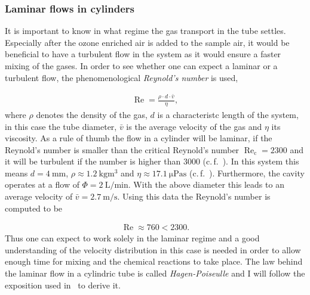 \subsubsection{Laminar flows in cylinders}
\label{sec:cylinder}

It is important to know in what regime the gas transport in the tube
settles. Especially after the ozone enriched air is added to the
sample air, it would be beneficial to have a turbulent flow in the
system as it would ensure a faster mixing of the gases. In order to see whether
one can expect a laminar or a turbulent flow, the phenomenological
\emph{Reynold's number} is used,

\begin{align*}
  \operatorname{Re} = \frac{\rho \cdot d \cdot \bar v}{\eta},
\end{align*}
where $\rho$ denotes the density of the gas, $d$ is a characteristc
length of the system, in this case the tube diameter, $\bar v$ is the
average velocity of the gas and $\eta$ its viscosity. As a rule of
thumb the flow in a cylinder will be laminar, if the Reynold's number
is smaller than the critical Reynold's number
$\operatorname{Re}_{\text{c}} = 2300$ and it will be turbulent if the
number is higher than $3000$ (c.\,f.~\cite{maschbau}). In this system
this means $d = \SI{4}{\milli\meter}$,
$\rho \approx \SI{1.2}{\kilo\gram\cubic\meter}$ and
$\eta \approx \SI{17.1}{\micro\pascal\second}$
(c.\,f.~\cite{maschbau}). Furthermore, the cavity operates at a flow
of $\Phi = \SI{2}{\liter\per\minute}$. With the above diameter this
leads to an average velocity of
$\bar v = \SI{2.7}{\meter\per\second}$. Using this data the Reynold's
number is computed to be

\begin{align*}
  \operatorname{Re} \approx 760 < 2300.
\end{align*}
Thus one can expect to work solely in the laminar regime and a good
understanding of the velocity distribution in this case is needed in
order to allow enough time for mixing and the chemical reactions to
take place. The law behind the laminar flow in a cylindric tube is
called \emph{Hagen-Poiseulle} and I will follow the exposition used
in~\cite{gerthsen} to derive it.

